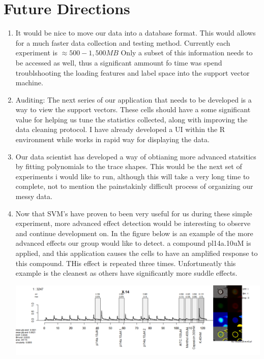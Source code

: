 \documentclass[11pt, fullpage,letterpaper]{article}
\begin{document}
\section{Future Directions}
\begin{enumerate}
\item It would be nice to move our data into a database format. This would allows for a much faster data collection and testing method. Currently each experiment is $\approx 500-1,500 MB$ Only a subset of this information needs to be accessed as well, thus a significant ammount fo time was spend troublshooting the loading features and label space into the support vector machine.  

\item Auditing: The next series of our application that needs to be developed is a way to view the support vectors. These cells should have a some significant value for helping us tune the statistics collected, along with improving the data cleaning protocol. I have already developed a UI within the R environment while works in rapid way for displaying the data.

\item Our data scientist has developed a way of obtianing more advanced statsitics by fitting polynomials to the trace shapes. This would be the next set of experiments i would like to run, although this will take a very long time to complete, not to mention the painstakinly difficult process of organizing our messy data.

\item Now that SVM's have proven to been very useful for us during these simple experiment, more advanced effect detection would be interesting to observe and continue development on. In the figure below is an example of the more advanced effects our group would like to detect. a compound pl14a.10uM is applied, and this application causes the cells to have an amplified response to this compound. THis effect is repeated three times.  Unfortuneatly this example is the cleanest as others have significantly more suddle effects.
\newline 
\begin{center}
	\includegraphics[scale=.35]{advanced_detection.png}\newline
\end{center}
\end{enumerate}
\end{document}
